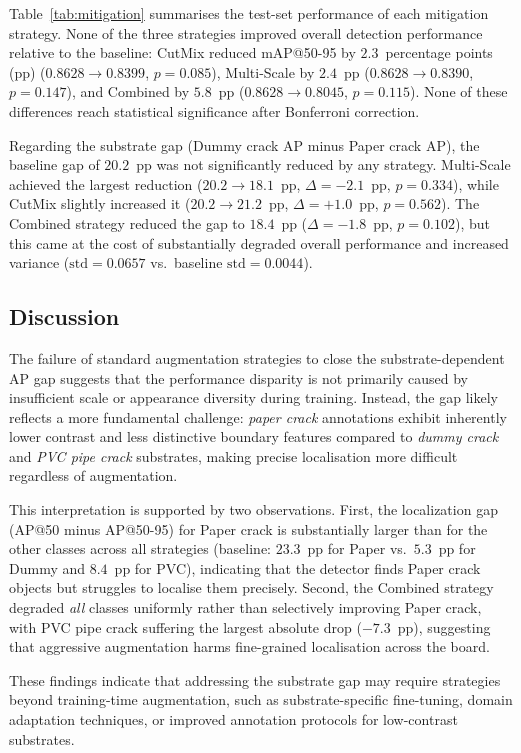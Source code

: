 Table~\ref{tab:mitigation} summarises the test-set performance of each
mitigation strategy.  None of the three strategies improved overall
detection performance relative to the baseline: CutMix reduced
mAP@50-95 by $2.3$~percentage points (pp)
($0.8628 \to 0.8399$, $p=0.085$), Multi-Scale by $2.4$~pp
($0.8628 \to 0.8390$, $p=0.147$), and Combined by $5.8$~pp
($0.8628 \to 0.8045$, $p=0.115$).  None of these differences reach
statistical significance after Bonferroni correction.

Regarding the substrate gap (Dummy crack AP minus Paper crack AP), the
baseline gap of $20.2$~pp was not significantly reduced by any strategy.
Multi-Scale achieved the largest reduction ($20.2 \to 18.1$~pp,
$\Delta=-2.1$~pp, $p=0.334$), while CutMix slightly increased it
($20.2 \to 21.2$~pp, $\Delta=+1.0$~pp, $p=0.562$).  The Combined
strategy reduced the gap to $18.4$~pp ($\Delta=-1.8$~pp, $p=0.102$),
but this came at the cost of substantially degraded overall performance
and increased variance ($\text{std}=0.0657$ vs.\ baseline
$\text{std}=0.0044$).




\subsection{Discussion}
\label{sec:mitigation_discussion}

The failure of standard augmentation strategies to close the
substrate-dependent AP gap suggests that the performance disparity is
not primarily caused by insufficient scale or appearance diversity
during training.  Instead, the gap likely reflects a more fundamental
challenge: \emph{paper crack} annotations exhibit inherently lower
contrast and less distinctive boundary features compared to
\emph{dummy crack} and \emph{PVC pipe crack} substrates, making
precise localisation more difficult regardless of augmentation.

This interpretation is supported by two observations.  First, the
localization gap (AP@50 minus AP@50-95) for Paper crack is
substantially larger than for the other classes across all strategies
(baseline: $23.3$~pp for Paper vs.\ $5.3$~pp for Dummy and $8.4$~pp
for PVC), indicating that the detector finds Paper crack objects but
struggles to localise them precisely.  Second, the Combined strategy
degraded \emph{all} classes uniformly rather than selectively improving
Paper crack, with PVC pipe crack suffering the largest absolute drop
($-7.3$~pp), suggesting that aggressive augmentation harms fine-grained
localisation across the board.

These findings indicate that addressing the substrate gap may require
strategies beyond training-time augmentation, such as
substrate-specific fine-tuning, domain adaptation techniques, or
improved annotation protocols for low-contrast substrates.

